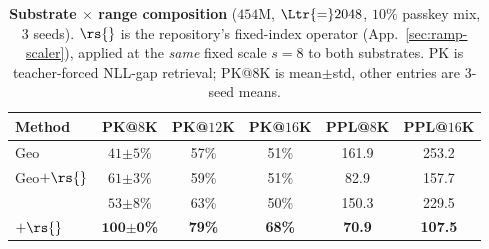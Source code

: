 \begin{table}[!htb]
\caption{\textbf{Substrate $\times$ range composition}
($454$M, $\Ltr{=}2048$, $10\%$ passkey mix, $3$ seeds). $\rs{}$ is the
repository's fixed-index operator (App.~\ref{sec:ramp-scaler}), applied at the
\emph{same} fixed scale $s{=}8$ to both substrates. PK is teacher-forced
NLL-gap retrieval; PK@$8$K is mean$\pm$std, other entries are $3$-seed means.}
\label{tab:evq-ramp}
\centering
\small
\setlength{\tabcolsep}{4pt}
\renewcommand{\arraystretch}{0.95}
\begin{tabular}{@{}lccccc@{}}
\toprule
Method & PK@$8$K & PK@$12$K & PK@$16$K & PPL@$8$K & PPL@$16$K \\
\midrule
Geo & $41{\scriptstyle\pm5}$\% & 57\% & 51\% & 161.9 & 253.2 \\
Geo$+\rs{}$ & $61{\scriptstyle\pm3}$\% & 59\% & 51\% & 82.9 & 157.7 \\
\evq{} & $53{\scriptstyle\pm8}$\% & 63\% & 50\% & 150.3 & 229.5 \\
\textbf{\evq{}$+\rs{}$} & $\mathbf{100{\scriptstyle\pm0}}$\textbf{\%} & \textbf{79\%} & \textbf{68\%} & \textbf{70.9} & \textbf{107.5} \\
\bottomrule
\end{tabular}%
\end{table}
